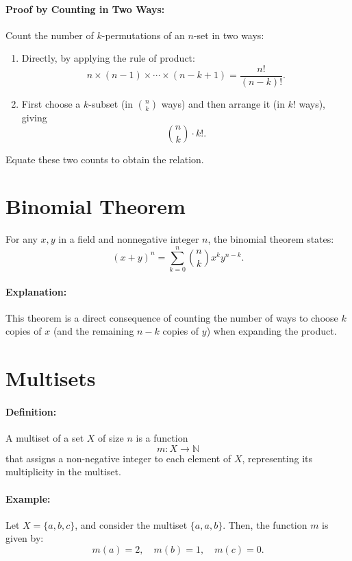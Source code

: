 \paragraph{Proof by Counting in Two Ways:}  
Count the number of $k$-permutations of an $n$-set in two ways:
\begin{enumerate}[label=(\arabic*)]
    \item Directly, by applying the rule of product:
    \[
    n \times (n-1) \times \cdots \times (n-k+1) = \frac{n!}{(n-k)!}.
    \]
    \item First choose a $k$-subset (in $\binom{n}{k}$ ways) and then arrange it (in $k!$ ways), giving
    \[
    \binom{n}{k} \cdot k!.
    \]
\end{enumerate}
Equate these two counts to obtain the relation.

\section{Binomial Theorem}
For any $x,y$ in a field and nonnegative integer $n$, the binomial theorem states:
\[
(x+y)^n = \sum_{k=0}^{n} \binom{n}{k} x^k y^{n-k}.
\]
\paragraph{Explanation:}  
This theorem is a direct consequence of counting the number of ways to choose $k$ copies of $x$ (and the remaining $n-k$ copies of $y$) when expanding the product.

\section{Multisets}  

\paragraph{Definition:}  
A multiset of a set \( X \) of size \( n \) is a function  
\[
m: X \to \mathbb{N}
\]
that assigns a non-negative integer to each element of \( X \), representing its multiplicity in the multiset.  

\paragraph{Example:}  
Let \( X = \{a, b, c\} \), and consider the multiset \( \{a, a, b\} \). Then, the function \( m \) is given by:  
\[
m(a) = 2, \quad m(b) = 1, \quad m(c) = 0.
\]  


